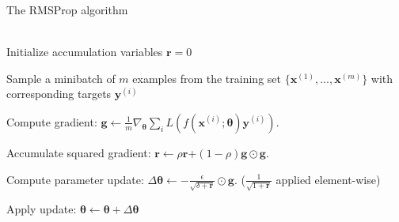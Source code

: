 \begin{algorithm}
\caption{The RMSProp algorithm}\label{alg:RMSProp}
\begin{algorithmic}
    
    \\
    Initialize accumulation variables $\boldsymbol{r}=0$
    

        Sample a minibatch of $m$ examples from the training set
        $\{\boldsymbol{x}^{(1)}, ..., \boldsymbol{x}^{(m)}\}$ with corresponding
        targets $\boldsymbol{y}^{(i)}$
    
        Compute gradient: $\boldsymbol{g} \gets
        \frac{1}{m}\nabla_{\boldsymbol\theta}
        \sum_{i}L(f(\boldsymbol{x}^{(i)};\boldsymbol{\theta})\boldsymbol{y}^{(i)})$.
        
        Accumulate squared gradient: $\boldsymbol{r} \gets
        \rho\boldsymbol{r}$+$(1-\rho)\boldsymbol{g}\odot\boldsymbol{g}$.

        Compute parameter update: 
        $\Delta\boldsymbol{\theta}\gets -\frac{\epsilon}{\sqrt{\delta+\boldsymbol{r}}}
        \odot\boldsymbol{g}$. ($\frac{1}{\sqrt{1+\boldsymbol{r}}}$ applied
        element-wise)
    
        Apply update: $\boldsymbol{\theta}\gets
        \boldsymbol\theta+\Delta\boldsymbol\theta$
    \EndWhile
\end{algorithmic}
\end{algorithm}


